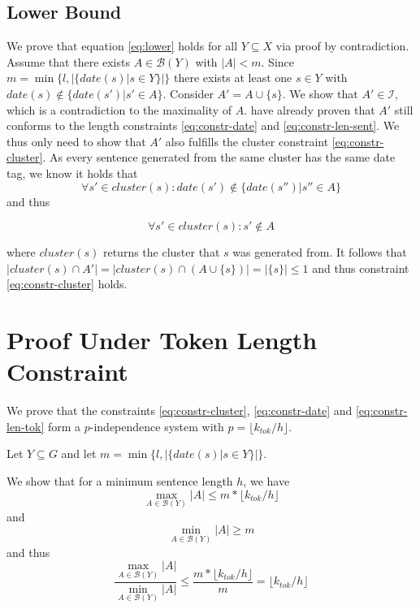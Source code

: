 \documentclass[a4paper,BCOR=10mm]{report}
\numberwithin{lemma}{chapter}
\numberwithin{definition}{chapter}
\begin{document}
\begin{appendices}
\subsection{Lower Bound} \label{sec:proof-date-lower}

We prove that equation \ref{eq:lower} holds for all $Y \subseteq X$ via proof by contradiction.
Assume that there exists $A \in \mathcal{B}(Y)$ with $|A| < m$.
Since $m = \min \{ l, |\{\mathit{date}(s) | s \in Y\}| \}$ there exists at least one $s \in Y$ with $\mathit{date}(s) \not\in \{\mathit{date}(s') | s' \in A\}$.
Consider $A' = A \cup \{ s \}$. We show that $A' \in \mathcal{I}$, which is a contradiction to the maximality of $A$. \citet{markert} have already proven that $A'$ still conforms to the length constraints \ref{eq:constr-date} and \ref{eq:constr-len-sent}.
We thus only need to show that $A'$ also fulfills the cluster constraint \ref{eq:constr-cluster}.
As every sentence generated from the same cluster has the same date tag, we know it holds that
\begin{equation}
\forall s' \in \mathit{cluster}(s): \mathit{date}(s') \not\in \{\mathit{date}(s'') | s'' \in A \}
\end{equation}
and thus

\begin{equation}
\forall s' \in \mathit{cluster}(s) : s' \not\in A
\end{equation}

where $\mathit{cluster}(s)$ returns the cluster that $s$ was generated from.
It follows that $|\mathit{cluster}(s) \cap A'| = |\mathit{cluster}(s) \cap (A \cup \{ s \})| = |\{s\}| \leq 1$ and thus constraint \ref{eq:constr-cluster} holds.


\section{Proof Under Token Length Constraint} \label{sec:proof-token-constr}

We prove that the constraints \ref{eq:constr-cluster}, \ref{eq:constr-date} and \ref{eq:constr-len-tok} form a $p$-independence system with $p = \lfloor k_{tok} / h \rfloor$.

Let $Y \subseteq G$ and let $m = \min \{ l, |\{\mathit{date}(s) | s \in Y\}| \}$.

We show that for a minimum sentence length $h$, we have 
\begin{equation}
\max_{A \in \mathcal{B}(Y)} |A| \leq m * \lfloor k_{tok} / h \rfloor
\end{equation}
and
\begin{equation}
    \min_{A \in \mathcal{B}(Y)} |A| \geq m
\end{equation}
and thus
\begin{equation}
\frac{\max_{A \in \mathcal{B}(Y)} |A|}{\min_{A \in \mathcal{B}(Y)} |A|}
\leq \frac{m * \lfloor k_{tok} / h \rfloor}{m} = \lfloor k_{tok} / h \rfloor
\end{equation}


\end{appendices}
\end{document}
